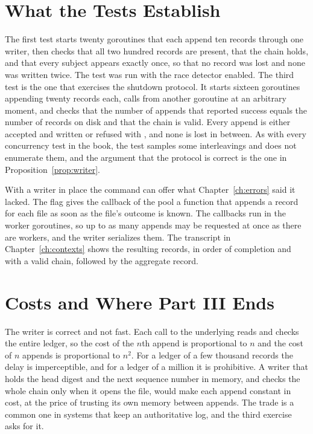 
\section{What the Tests Establish}

The first test starts twenty goroutines that each append ten records through one writer, then checks that all two hundred records are present, that the chain holds, and that every subject appears exactly once, so that no record was lost and none was written twice. The test was run with the race detector enabled. The third test is the one that exercises the shutdown protocol. It starts sixteen goroutines appending twenty records each, calls  from another goroutine at an arbitrary moment, and checks that the number of appends that reported success equals the number of records on disk and that the chain is valid. Every append is either accepted and written or refused with , and none is lost in between. As with every concurrency test in the book, the test samples some interleavings and does not enumerate them, and the argument that the protocol is correct is the one in Proposition~\ref{prop:writer}.

With a writer in place the command can offer what Chapter~\ref{ch:errors} said it lacked. The flag  gives the  callback of the pool a function that appends a record for each file as soon as the file's outcome is known. The callbacks run in the worker goroutines, so up to as many appends may be requested at once as there are workers, and the writer serializes them. The transcript in Chapter~\ref{ch:contexts} shows the resulting records, in order of completion and with a valid chain, followed by the aggregate record.

\section{Costs and Where Part III Ends}

The writer is correct and not fast. Each call to the underlying  reads and checks the entire ledger, so the cost of the $n$th append is proportional to $n$ and the cost of $n$ appends is proportional to $n^2$. For a ledger of a few thousand records the delay is imperceptible, and for a ledger of a million it is prohibitive. A writer that holds the head digest and the next sequence number in memory, and checks the whole chain only when it opens the file, would make each append constant in cost, at the price of trusting its own memory between appends. The trade is a common one in systems that keep an authoritative log, and the third exercise asks for it.

